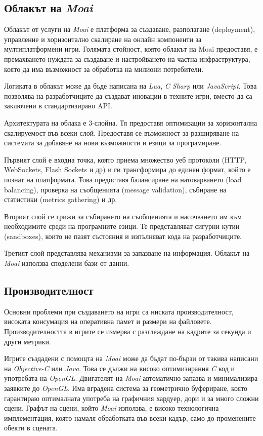 		\subsection{Облакът на \emph{Moai}}
		
			Облакът от услуги на \emph{Moai} е платформа за създаване, разполагане (deployment), управление и 
			хоризонтално скалиране на онлайн компоненти за мултиплатформени игри. Голямата стойност, която облакът
			на Moai предоставя, е премахването нуждата за създаване и настройването на частна инфраструктура, която
			да има възможност за обработка на милиони потребители.
			
			Логиката в облакът може да бъде написана на \emph{Lua}, \emph{C Sharp} или \emph{JavaScript}.
			Това позволява на разработчиците да създават иновации в техните игри, вместо да са заключени
			в стандартизирано \ac{API}.
			
			Архитектурата на облака е 3-слойна. Тя предоставя оптимизации за хоризонтална скалируемост във
			всеки слой. Предоставя се възможност за разширяване на системата за добавяне на нови възможности
			и езици за програмиране.
			
			Първият слой е входна точка, която приема множество уеб протоколи (HTTP, WebSockets, Flash Sockets и др) и ги 
			трансформира до единен формат, който е познат на платформата. Това предоставя балансиране на натоварването (load balancing),
			проверка на съобщенията (message validation), събиране на статистики (metrics gathering) и др.
			
			Вторият слой се грижи за събирането на съобщенията и насочването им към необходимите среди на програмните езици.
			Те представляват сигурни кутии (sandboxes), които не пазят състояния и изпълняват кода на разработчиците.
			
			Третият слой представлява механизми за запазване на информация. Облакът на \emph{Moai} използва споделени
			бази от данни.
			
		\subsection{Производителност}
		
			Основни проблеми при създаването на игри са ниската производителност, високата консумация на оперативна памет
			и размери на файловете. Производителността в игрите се измерва с разглеждане на кадрите за секунда и други метрики.
			
			Игрите създадени с помощта на \emph{Moai} може да бъдат по-бързи от такива написани на \emph{Objective-C} или \emph{Java}.
			Това се дължи на високо оптимизирания \emph{C} код и употребата на \emph{OpenGL}. Двигателят на \emph{Moai} автоматично
			запазва и минимализира заявките до \emph{OpenGL}. Има вградена система за геометрично буфериране, която гарантираю
			оптималната употреба на графичния хардуер, дори и за много сложни сцени. Графът на сцени, който \emph{Moai} използва,
			е високо технологична имплементация, която намаля обработката във всеки кадър, само до променените обекти в сцената.
			
